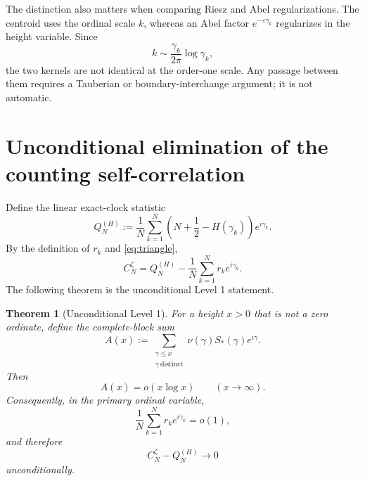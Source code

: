 \documentclass[11pt]{amsart}
\numberwithin{equation}{section}
\newtheorem{theorem}{Theorem}[section]
\theoremstyle{definition}
\theoremstyle{remark}
\begin{document}
The distinction also matters when comparing Riesz and Abel regularizations. The centroid uses the ordinal scale $k$, whereas an Abel factor $e^{-\varepsilon\gamma_k}$ regularizes in the height variable. Since
\[
k\sim \frac{\gamma_k}{2\pi}\log\gamma_k,
\]
the two kernels are not identical at the order-one scale. Any passage between them requires a Tauberian or boundary-interchange argument; it is not automatic.

\section{Unconditional elimination of the counting self-correlation}\label{sec:level1}

Define the linear exact-clock statistic
\begin{equation}\label{eq:QH}
Q_N^{(H)}
:=\frac1N\sum_{k=1}^N
\left(N+\frac12-H(\gamma_k)\right)e^{i\gamma_k}.
\end{equation}
By the definition of $r_k$ and \eqref{eq:triangle},
\begin{equation}\label{eq:exactCQ}
\boxed{
C_N^{\zeta}=Q_N^{(H)}-\frac1N\sum_{k=1}^N r_ke^{i\gamma_k}.
}
\end{equation}
The following theorem is the unconditional Level 1 statement.

\begin{theorem}[Unconditional Level 1]\label{thm:level1}
For a height \(x>0\) that is not a zero ordinate, define the complete-block sum
\begin{equation}\label{eq:Ax_definition}
A(x):=
\sum_{\substack{\gamma\le x\\ \gamma\ \mathrm{distinct}}}
\nu(\gamma)S_*(\gamma)e^{i\gamma}.
\end{equation}
Then
\begin{equation}\label{eq:Ax_bound}
A(x)=o(x\log x)
\qquad (x\to\infty).
\end{equation}
Consequently, in the primary ordinal variable,
\begin{equation}\label{eq:level1rate}
\boxed{
\frac1N\sum_{k=1}^N r_ke^{i\gamma_k}=o(1),
}
\end{equation}
and therefore
\begin{equation}\label{eq:CQlimit}
\boxed{C_N^{\zeta}-Q_N^{(H)}\longrightarrow0}
\end{equation}
unconditionally.
\end{theorem}
\end{document}
